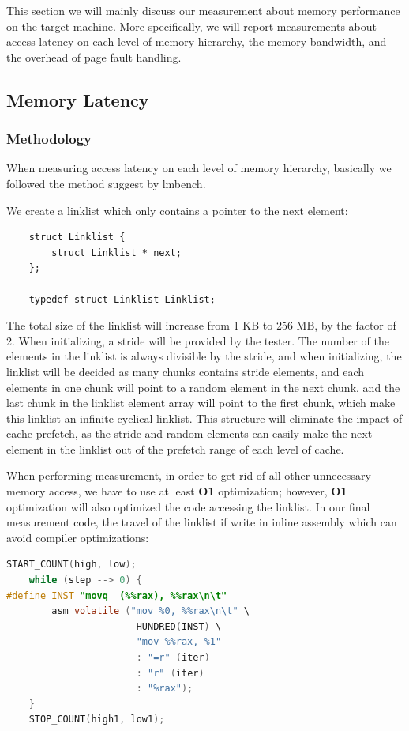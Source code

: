 	
% 

This section we will mainly discuss our measurement about memory performance on the target machine. More specifically, we will report measurements about access latency on each level of memory hierarchy, the memory bandwidth, and the overhead of page fault handling.

\subsection{Memory Latency}

\subsubsection{Methodology}

When measuring access latency on each level of memory hierarchy, basically we followed the method suggest by lmbench\cite{mcvoy1996lmbench}.

We create a linklist which only contains a pointer to the next element:

\begin{lstlisting}
    struct Linklist {
        struct Linklist * next;
    };

    typedef struct Linklist Linklist;
\end{lstlisting}

The total size of the linklist will increase from 1 KB to 256 MB, by the factor of 2. When initializing, a stride will be provided by the tester. The number of the elements in the linklist is always divisible by the stride, and when initializing, the linklist will be decided as many chunks contains stride elements, and each elements in one chunk will point to a random element in the next chunk, and the last chunk in the linklist element array will point to the first chunk, which make this linklist an infinite cyclical linklist. This structure will eliminate the impact of cache prefetch, as the stride and random elements can easily make the next element in the linklist out of the prefetch range of each level of cache.

When performing measurement, in order to get rid of all other unnecessary memory access, we have to use at least \textbf{O1} optimization; however, \textbf{O1} optimization will also optimized the code accessing the linklist. In our final measurement code, the travel of the linklist if write in inline assembly which can avoid compiler optimizations:

\begin{lstlisting}[language=C]
    START_COUNT(high, low);
    while (step --> 0) {
#define INST "movq	(%%rax), %%rax\n\t"
        asm volatile ("mov %0, %%rax\n\t" \
                       HUNDRED(INST) \
                       "mov %%rax, %1"
                       : "=r" (iter)
                       : "r" (iter)
                       : "%rax");
    }
    STOP_COUNT(high1, low1);
\end{lstlisting}

